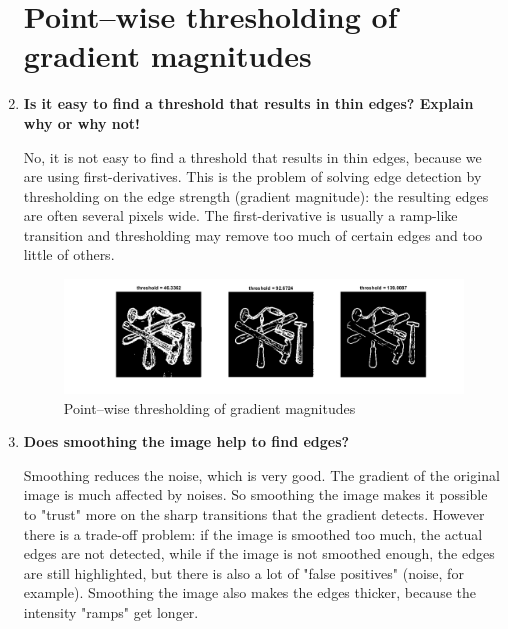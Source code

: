 \documentclass{article}
\begin{document}
\begin{enumerate}
    
    

\section{Point–wise thresholding of gradient magnitudes}
    \item %
    \textbf{Is it easy to find a threshold that results in thin edges? Explain why or why not!}
    
    No, it is not easy to find a threshold that results in thin edges, because we are using first-derivatives. This is the problem of solving edge detection by thresholding on the edge strength (gradient magnitude): the resulting edges are often several pixels wide. The first-derivative is usually a ramp-like transition and thresholding may remove too much of certain edges and too little of others.
    \begin{figure}[H]
        \centering
        \includegraphics[width=\linewidth]{Lab2-Q2.png}
        \caption{Point–wise thresholding of gradient magnitudes}
        \label{fig:q2}
    \end{figure}
    
    \item %
    \textbf{Does smoothing the image help to find edges?}
    
    Smoothing reduces the noise, which is very good. The gradient of the original image is much affected by noises. So smoothing the image makes it possible to "trust" more on the sharp transitions that the gradient detects. However there is a trade-off problem: if the image is smoothed too much, the actual edges are not detected, while if the image is not smoothed enough, the edges are still highlighted, but there is also a lot of "false positives" (noise, for example). Smoothing the image also makes the edges thicker, because the intensity "ramps" get longer.
    

\end{enumerate}
\end{document}
